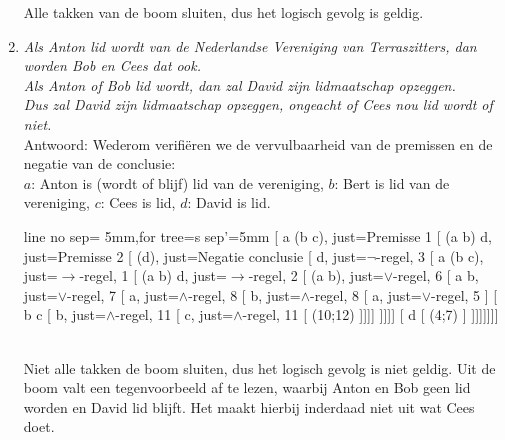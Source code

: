 \begin{answer}
\begin{enumerate}[label=\textit{\alph*.}]
\begin{center}
Alle takken van de boom sluiten, dus het logisch gevolg is geldig.
\end{center}
\newpage
\item\textit{Als Anton lid wordt van de Nederlandse Vereniging van Terraszitters, dan worden Bob en Cees dat ook.}\\
\textit{Als Anton of Bob lid wordt, dan zal David zijn lidmaatschap opzeggen.}\\
\textit{Dus zal David zijn lidmaatschap opzeggen, ongeacht of Cees nou lid wordt of niet.}\\
Antwoord: Wederom verifi\"eren we de vervulbaarheid van de premissen en de negatie van de conclusie:\\
    $a$: Anton is (wordt of blijf) lid van de vereniging, $b$: Bert is lid van de vereniging, $c$: Cees is lid, $d$: David is lid.
\begin{center}
\begin{tableau}{line no sep= 5mm,for tree={s sep'=5mm}}
[ a \to (b \land c),               just={Premisse 1}
[ (a \lor b) \to \neg d,           just={Premisse 2}
[ \neg (\neg d),                   just={Negatie conclusie}
[ d,                               just={$\neg$-regel, 3}
[ \neg a \lor (b \land c),         just={$\to$-regel, 1}
[ \neg (a \lor b) \lor \neg d,     just={$\to$-regel, 2}
  [ \neg (a \lor b),               just={$\lor$-regel, 6}
  [ \neg a \land \neg b,           just={$\lor$-regel, 7}
  [ \neg a,                        just={$\land$-regel, 8}
  [ \neg b,                        just={$\land$-regel, 8}
    [ \neg a,                      just={$\lor$-regel, 5}
    ]
    [ b \land c
    [ b,                           just={$\land$-regel, 11}
    [ c,                           just={$\land$-regel, 11}
      [ \bot (10;12) ]]]]
  ]]]]
  [ \neg d
    [ \bot (4;7) ]
  ]]]]]]]
\end{tableau}\\[3mm]
Niet alle takken de boom sluiten, dus het logisch gevolg is niet geldig. Uit de boom valt een tegenvoorbeeld af te lezen, waarbij Anton en Bob geen lid worden en David lid blijft. Het maakt hierbij inderdaad niet uit wat Cees doet.
\end{center}


\end{enumerate}
\end{answer}
